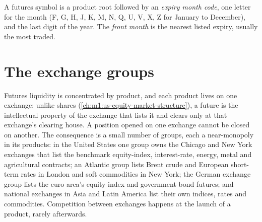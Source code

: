 \begin{definition}\label{def:m1:futures-contracts-and-exchanges:code}
A futures symbol is a product root followed by an \emph{expiry month
code}, one letter for the month (F, G, H, J, K, M, N,
Q, U, V, X, Z for January to December), and the last digit of the year. The
\emph{front month} is the nearest listed expiry, usually
the most traded.
\end{definition}

\begin{omfigure}

\label{fig:m1:futures-contracts-and-exchanges:symbol}
\end{omfigure}

\section{The exchange groups}

Futures liquidity is concentrated by product, and each product lives on one
exchange: unlike shares (\cref{ch:m1:us-equity-market-structure}), a future is
the intellectual property of the exchange that lists it and clears only at
that exchange's clearing house. A position opened on one exchange cannot be
closed on another. The consequence is a small number of groups, each a
near-monopoly in its products: in the United States one group owns the
Chicago and New York exchanges that list the benchmark equity-index,
interest-rate, energy, metal and agricultural contracts; an Atlantic group
lists Brent crude and European short-term rates in London and soft
commodities in New York; the German exchange group lists the euro area's
equity-index and government-bond futures; and national exchanges in Asia and
Latin America list their own indices, rates and commodities. Competition
between exchanges happens at the launch of a product, rarely afterwards.

